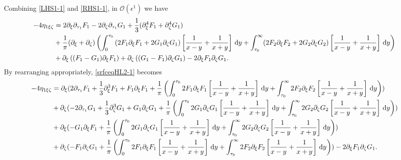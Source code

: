 \documentclass[10pt,reqno,oneside,a4paper, landscape]{article}
\begin{document}
Combining \eqref{LHS1-1} and \eqref{RHS1-1}, in $\mathcal{O}(\epsilon^1)$ we have
\begin{equation}\label{srfceqHL2-1}
\begin{aligned}
- 4\eta_{1\xi \zeta} &= 2 \partial_\xi \partial_{\tau_1}F_1 - 2\partial_{\zeta} \partial_{\tau_1}G_1  + \frac{1}{3}(\partial_\xi^4 F_1 + \partial_\zeta^4 G_1) \\
&+ \frac{1}{\pi} (\partial_\xi + \partial_\zeta) \left( \int_0^{\tau_0} \left( 2 F_1  \partial_\xi F_1 + 2 G_1 \partial_\zeta G_1 \right) \left[ \frac{1}{x-y} + \frac{1}{x+y} \right] \,\mathrm{d} y +\int_{\tau_0}^\infty (2 F_2 \partial_\xi F_2 + 2 G_2 \partial_\zeta G_2 )\left[ \frac{1}{x-y} + \frac{1}{x+y} \right] \,\mathrm{d} y \right) \\
&+ \partial_\xi\left( (F_1 - G_1)\partial_\xi F_1 \right) +  \partial_\zeta \left( (G_1 - F_1)\partial_\zeta G_1 \right) - 2 \partial_\xi F_1 \partial_\zeta G_1.
\end{aligned}
\end{equation}
By rearranging appropriately, \eqref{srfceqHL2-1} becomes
\begin{equation}\label{srfceqHL3-1}
\begin{aligned}
- 4\eta_{1\xi \zeta} &= \partial_\xi (2 \partial_{\tau_1}F_1 + \frac{1}{3} \partial_\xi^3 F_1 + F_1\partial_\xi F_1 + \frac{1}{\pi} \left( \int_0^{\tau_0} 2 F_1  \partial_\xi F_1 \left[ \frac{1}{x-y} + \frac{1}{x+y} \right] \,\mathrm{d} y +\int_{\tau_0}^\infty 2 F_2 \partial_\xi F_2\left[ \frac{1}{x-y} + \frac{1}{x+y} \right] \,\mathrm{d} y \right))  \\
&+ \partial_\zeta(- 2 \partial_{\tau_1} G_1 +  \frac{1}{3} \partial_\zeta^3 G_1+ G_1 \partial_{\zeta} G_1  + \frac{1}{\pi} \left( \int_0^{\tau_0}  2 G_1 \partial_\zeta G_1 \left[ \frac{1}{x-y} + \frac{1}{x+y} \right] \,\mathrm{d} y +\int_{\tau_0}^\infty 2 G_2 \partial_\zeta G_2 \left[ \frac{1}{x-y} + \frac{1}{x+y} \right] \,\mathrm{d} y \right)) \\
&+ \partial_{\xi}(-G_1 \partial_\xi F_1 + \frac{1}{\pi} \left( \int_0^{\tau_0} 2 G_1 \partial_\zeta G_1 \left[ \frac{1}{x-y} + \frac{1}{x+y} \right] \,\mathrm{d} y +\int_{\tau_0}^\infty 2 G_2 \partial_\zeta G_2 \left[ \frac{1}{x-y} + \frac{1}{x+y} \right] \,\mathrm{d} y \right) ) \\
&+ \partial_{\zeta}( - F_1\partial_\zeta G_1 + \frac{1}{\pi} \left( \int_0^{\tau_0} 2 F_1  \partial_\xi F_1 \left[ \frac{1}{x-y} + \frac{1}{x+y} \right] \,\mathrm{d} y +\int_{\tau_0}^\infty 2 F_2 \partial_\xi F_2  \left[ \frac{1}{x-y} + \frac{1}{x+y} \right] \,\mathrm{d} y \right)) - 2 \partial_\xi F_1 \partial_\zeta G_1. 
\end{aligned}
\end{equation}
\end{document}
